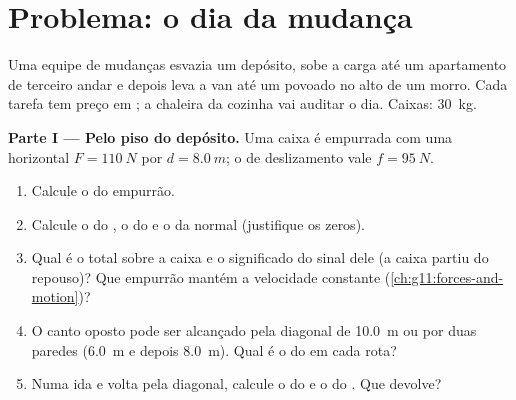 \section{Problema: o dia da mudança}

\begin{problem}
\label{pb:g11:work-of-force:1}
Uma equipe de mudanças esvazia um depósito, sobe a carga até um
apartamento de terceiro andar e depois leva a van até um povoado no alto
de um morro. Cada tarefa tem preço em ; a chaleira da cozinha vai
auditar o dia. Caixas: \qty{30}{kg}.

\medskip
\noindent\textbf{Parte I --- Pelo piso do depósito.}
Uma caixa é empurrada com uma  horizontal $F = \qty{110}{N}$ por
$d = \qty{8.0}{m}$; o  de deslizamento vale $f = \qty{95}{N}$.
\begin{enumerate}
  \item Calcule o  do empurrão.
  \item Calcule o  do , o do  e o da  normal
        (justifique os zeros).
  \item Qual é o  total sobre a caixa e o significado do sinal
        dele (a caixa partiu do repouso)? Que empurrão mantém a
        velocidade constante (\cref{ch:g11:forces-and-motion})?
  \item O canto oposto pode ser alcançado pela diagonal de \qty{10.0}{m}
        ou por duas paredes (\qty{6.0}{m} e depois \qty{8.0}{m}). Qual é
        o  do  em cada rota?
  \item Numa ida e volta pela diagonal, calcule o  do  e o
         do . Que  devolve?
\end{enumerate}


\end{problem}
